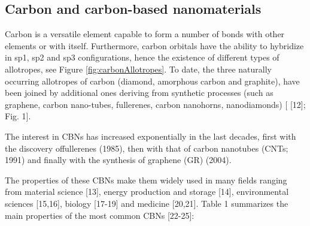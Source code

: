 \subsection{Carbon and carbon-based nanomaterials}

Carbon is a versatile element capable to form a number of bonds with other elements or with itself. Furthermore, carbon orbitals have the ability to hybridize in sp1, sp2 and sp3 configurations, hence the existence of different types of allotropes, see Figure \ref{fig:carbonAllotropes}. To date, the three naturally occurring allotropes of carbon (diamond, amorphous carbon and graphite), have been joined by additional ones deriving from synthetic processes (such as graphene, carbon nano-tubes, fullerenes, carbon nanohorns, nanodiamonds) [ [12]; Fig. 1].

The interest in CBNs has increased exponentially in the last
decades, first with the discovery offullerenes (1985), then with that of carbon nanotubes (CNTs; 1991) and finally with the synthesis of graphene (GR) (2004).

The properties of these CBNs make them widely used in many
fields ranging from material science [13], energy production and storage [14], environmental sciences [15,16], biology [17-19] and medicine [20,21]. Table 1 summarizes the main properties of the most common CBNs [22-25]:

